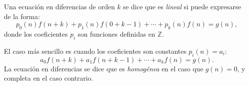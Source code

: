 Una ecuación en diferencias de orden $k$ se dice que es \emph{lineal} si puede expresarse de la forma:
\begin{equation*}
p_{0}(n)f(n+k)+p_{1}(n)f(0+k-1)+\cdots+p_{k}(n)f(n)=g(n),
\end{equation*}
donde los coeficientes $p_{i}$ son funciones definidas en $\mathds{Z}$.

El caso más sencillo es cuando los coeficientes son constantes $p_{i}(n)=a_{i}$:
\begin{equation*}
a_{0}f(n+k)+a_{1}f(n+k-1)+\cdots+a_{k}f(n)=g(n).
\end{equation*}
La ecuación en diferencias se dice que es \emph{homogénea} en el caso que $g(n)=0$, y completa en el caso contrario.